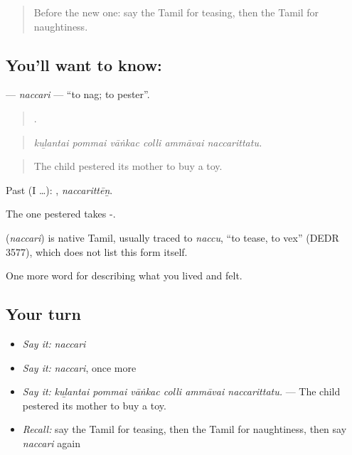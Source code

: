 \label{lesson:TA-C467-naccari}



\begin{quote}
Before the new one: say the Tamil for teasing, then the Tamil for naughtiness.
\end{quote}

\subsection*{You'll want to know: }
\textbf{} — \emph{naccari} — \textquotedblleft{}to nag; to pester\textquotedblright{}.

\begin{quote}
     .
\end{quote}

\begin{quote}
\emph{kuḻantai pommai vāṅkac colli ammāvai naccarittatu.}
\end{quote}

\begin{quote}
The child pestered its mother to buy a toy.
\end{quote}

Past (I …): , \emph{naccarittēṉ}.

The one pestered takes -.

\begin{cousinweb}
\textbf{} (\emph{naccari}) is native Tamil, usually traced to  \emph{naccu}, \textquotedblleft{}to tease, to vex\textquotedblright{} (DEDR 3577), which does not list this form itself.
\end{cousinweb}

\begin{grammarlens}[title={What you've built}]
One more word for describing what you lived and felt.
\end{grammarlens}

\subsection*{Your turn}
\begin{itemize}
\raggedright
  \item \emph{Say it:} \emph{naccari}
  \item \emph{Say it:} \emph{naccari}, once more
  \item \emph{Say it:} \emph{kuḻantai pommai vāṅkac colli ammāvai naccarittatu.} — The child pestered its mother to buy a toy.
  \item \emph{Recall:} say the Tamil for teasing, then the Tamil for naughtiness, then say \emph{naccari} again
\end{itemize}

